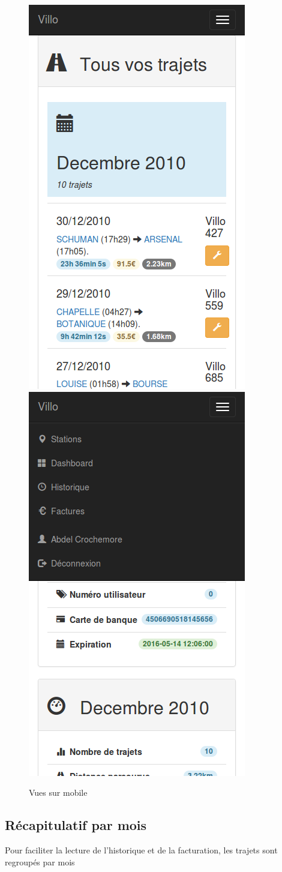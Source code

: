 \documentclass[a4paper,10pt]{article}
\begin{document}
\begin{figure}[H]
  \centering
  \includegraphics[width=.4\textwidth]{mobile-historique.png}
  \hfill
  \includegraphics[width=.4\textwidth]{mobile-menu.png}
  \caption{\label{fig:mobile} Vues sur mobile}
\end{figure}

\subsection{Récapitulatif par mois}
Pour faciliter la lecture de l'historique et de la facturation, les trajets sont
regroupés par mois
\end{document}
